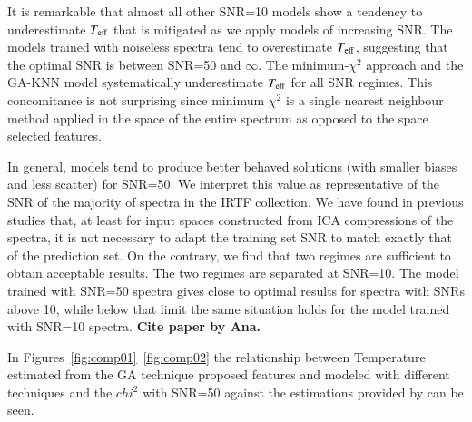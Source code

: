 It is remarkable that almost all other SNR=10 models show a tendency
to underestimate $T_{\rm eff}$ that is mitigated as we apply models of
increasing SNR. The models trained with noiseless spectra tend to
overestimate $T_{\rm eff}$, suggesting that the optimal SNR is between
SNR=50 and $\infty$. The minimum-$\chi^2$ approach and the GA-KNN
model systematically underestimate $T_{\rm eff}$ for all SNR
regimes. This concomitance is not surprising since minimum $\chi^2$ is
a single nearest neighbour method applied in the space of the entire
spectrum as opposed to the space selected features.

In general, models tend to produce better behaved solutions (with
smaller biases and less scatter) for SNR=50. We interpret this value
as representative of the SNR of the majority of spectra in the IRTF
collection. We have found in previous studies that, at least for input
spaces constructed from ICA compressions of the spectra, it is not
necessary to adapt the training set SNR to match exactly that of the
prediction set. On the contrary, we find that two regimes are
sufficient to obtain acceptable results. The two regimes are separated
at SNR=10. The model trained with SNR=50 spectra gives close to
optimal results for spectra with SNRs above 10, while below that limit
the same situation holds for the model trained with SNR=10
spectra. {\bf Cite paper by Ana.}


In Figures~\ref{fig:comp01}~\ref{fig:comp02} the relationship between Temperature
estimated from the GA technique proposed features and modeled with different 
techniques and the $chi^2$ with SNR=50 against the 
estimations provided by \cite{cesetti} can be seen.

